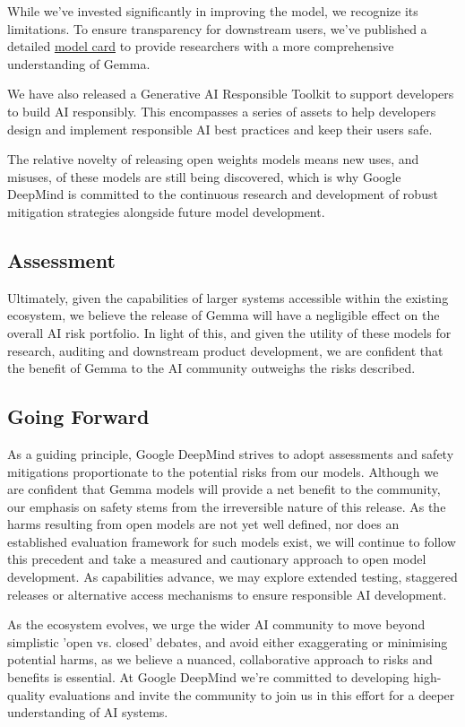 \documentclass[11pt, a4paper, logo, twocolumn, copyright, nonumbering]{googledeepmind}
\begin{document}
While we've invested significantly in improving the model, we recognize its limitations. To ensure transparency for downstream users, we've published a detailed \href{https://ai.google.dev/gemma/docs/model_card}{model card} to provide researchers with a more comprehensive understanding of Gemma.

We have also released a Generative AI Responsible Toolkit to support developers to build AI responsibly. This encompasses a series of assets to help developers design and implement responsible AI best practices and keep their users safe.

The relative novelty of releasing open weights models means new uses, and misuses, of these models are still being discovered, which is why Google DeepMind is committed to the continuous research and development of robust mitigation strategies alongside future model development.

\vspace{-2mm}
\subsection{Assessment}
Ultimately, given the capabilities of larger systems accessible within the existing ecosystem, we believe the release of Gemma will have a negligible effect on the overall AI risk portfolio. In light of this, and given the utility of these models for research, auditing and downstream product development, we are confident that the benefit of Gemma to the AI community outweighs the risks described.  

\subsection{Going Forward}
As a guiding principle, Google DeepMind strives to adopt assessments and safety mitigations proportionate to the potential risks from our models. Although we are confident that Gemma models will provide a net benefit to the community, our emphasis on safety stems from the irreversible nature of this release. As the harms resulting from open models are not yet well defined, nor does an established evaluation framework for such models exist, we will continue to follow this precedent and take a measured and cautionary approach to open model development. As capabilities advance, we may explore extended testing, staggered releases or alternative access mechanisms to ensure responsible AI development.

As the ecosystem evolves, we urge the wider AI community to move beyond simplistic 'open vs. closed' debates, and avoid either exaggerating or minimising potential harms, as we believe a nuanced, collaborative approach to risks and benefits is essential. At Google DeepMind we're committed to developing high-quality evaluations and invite the community to join us in this effort for a deeper understanding of AI systems.
\end{document}
